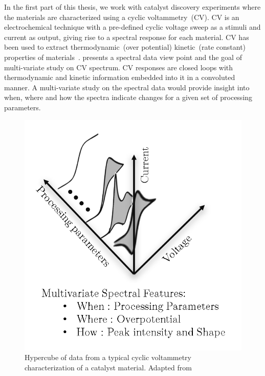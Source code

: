 In the first part of this thesis, we work with catalyst discovery experiments where the materials are characterized using a cyclic voltammetry~(CV). 
CV is an electrochemical technique with a pre-defined cyclic voltage sweep as a stimuli and current as output, giving rise to a spectral response for each material. 
CV has been used to extract thermodynamic~(over potential) kinetic~(rate constant) properties of materials~\cite{martin2016qualitative,rountree2014evaluation,haber2014high}.  presents a spectral data view point and the goal of multi-variate study on CV spectrum. 
CV responses are closed loops with thermodynamic and kinetic information embedded into it in a convoluted manner. 
A multi-variate study on the spectral data would provide insight into when, where and how the spectra indicate changes for a given set of processing parameters.

\begin{figure}[h!]
    \centering
    \includegraphics[width=0.45\columnwidth]{Chapter-1/figures/spectral_hypercube.png}
    \caption{Hypercube of data from a typical cyclic voltammetry characterization of a catalyst material. Adapted from~\cite{rajan2013informatics}}
    \label{fig:spectrahypercube}
\end{figure}


